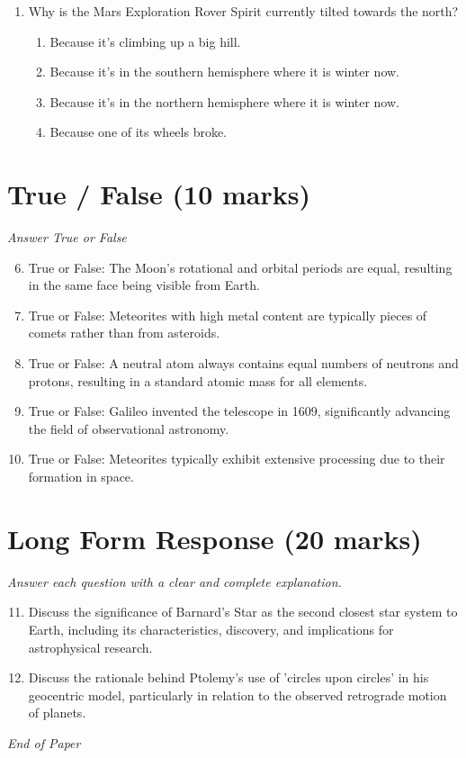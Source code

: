 \documentclass[12pt]{article}
\begin{document}
\begin{enumerate}[label=\arabic*.]
\begin{enumerate}[label=(\alph*)]
    \item Cassiopeia
    \item Cepheus
\end{enumerate}
\item Why is the Mars Exploration Rover Spirit currently tilted towards the north?
\begin{enumerate}[label=(\alph*)]
    \item Because it's climbing up a big hill.
    \item Because it's in the southern hemisphere where it is winter now.
    \item Because it's in the northern hemisphere where it is winter now.
    \item Because one of its wheels broke.
\end{enumerate}
\end{enumerate}

\section*{True / False (10 marks)}
\textit{Answer True or False}
\begin{enumerate}[label=\arabic*.]
\setcounter{enumi}{5}
\item True or False: The Moon's rotational and orbital periods are equal, resulting in the same face being visible from Earth.
\item True or False: Meteorites with high metal content are typically pieces of comets rather than from asteroids.
\item True or False: A neutral atom always contains equal numbers of neutrons and protons, resulting in a standard atomic mass for all elements.
\item True or False: Galileo invented the telescope in 1609, significantly advancing the field of observational astronomy.
\item True or False: Meteorites typically exhibit extensive processing due to their formation in space.
\end{enumerate}

\section*{Long Form Response (20 marks)}
\textit{Answer each question with a clear and complete explanation.}
\begin{enumerate}[label=\arabic*.]
\setcounter{enumi}{10}
\item Discuss the significance of Barnard's Star as the second closest star system to Earth, including its characteristics, discovery, and implications for astrophysical research.
\item Discuss the rationale behind Ptolemy's use of 'circles upon circles' in his geocentric model, particularly in relation to the observed retrograde motion of planets.
\end{enumerate}

\vfill
\noindent\textit{End of Paper}
\end{document}
